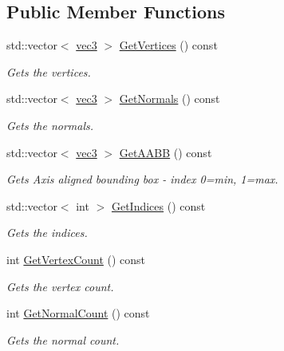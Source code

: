 \subsection*{Public Member Functions}
\begin{DoxyCompactItemize}
\item 
std\+::vector$<$ \hyperlink{_types_8h_a3d0ce73e3199de81565fb01632415288}{vec3} $>$ \hyperlink{class_i_mesh_collection_af3ad8b8f405ae37eaff19f9965ea6148}{Get\+Vertices} () const 
\begin{DoxyCompactList}\small\item\em Gets the vertices. \end{DoxyCompactList}\item 
std\+::vector$<$ \hyperlink{_types_8h_a3d0ce73e3199de81565fb01632415288}{vec3} $>$ \hyperlink{class_i_mesh_collection_a752157903d879f04676e2515b8922947}{Get\+Normals} () const 
\begin{DoxyCompactList}\small\item\em Gets the normals. \end{DoxyCompactList}\item 
std\+::vector$<$ \hyperlink{_types_8h_a3d0ce73e3199de81565fb01632415288}{vec3} $>$ \hyperlink{class_i_mesh_collection_a9220e6bdd01ac0b8026149918ea73c41}{Get\+A\+A\+BB} () const 
\begin{DoxyCompactList}\small\item\em Gets Axis aligned bounding box -\/ index 0=min, 1=max. \end{DoxyCompactList}\item 
std\+::vector$<$ int $>$ \hyperlink{class_i_mesh_collection_ab5ef69beb5b87b0d791ade776dfd3ad0}{Get\+Indices} () const 
\begin{DoxyCompactList}\small\item\em Gets the indices. \end{DoxyCompactList}\item 
int \hyperlink{class_i_mesh_collection_a10bb5dc252b1dbebcebf8580806b3998}{Get\+Vertex\+Count} () const 
\begin{DoxyCompactList}\small\item\em Gets the vertex count. \end{DoxyCompactList}\item 
int \hyperlink{class_i_mesh_collection_acde6f34cd34609bacdc9c1357cc2ee33}{Get\+Normal\+Count} () const 
\begin{DoxyCompactList}\small\item\em Gets the normal count. \end{DoxyCompactList}\item 

\end{DoxyCompactItemize}
